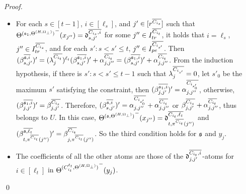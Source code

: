 \begin{appendix}
{\begin{proof}
\begin{itemize}
	\item For each $s \in [t-1]$, $i \in [\ell_s]$, and $j' \in [r^{\overline{C_{i_s}}}]$ such that ${\Theta^{({\mathfrak{s} }_1,\Theta^{(H,\Omega_\bot)})}}^-(x_{j''}) = \mathfrak{d}^{\overline{C_{i_s}, i}}_{s, j'}$ for some $j'' \in I^{\overline{C_{i_t}}}_{tr}$, it holds that $i = \ell_s$, $j'' \in I^{\overline{C_{i_s}}}_{tr}$, and for each $s': s < s' \le t$, $j'' \in I^{\overline{C_{i_{s'}}}}_{pe}$. Then $(\beta^{\overline{{\mathfrak{s} },i}}_{s,j'})' =(\lambda^{\overline{C_{i_t}}}_{j})^{\ell_t}  (\beta^{\overline{{\mathfrak{s} }_1, i}}_{s, j'})' + \alpha^{\overline{C_{i_t}}}_{j, j''}  =  (\beta^{\overline{{\mathfrak{s} }_1, i}}_{s, j'})' + \alpha^{\overline{C_{i_t}}}_{j, j''}$. From the induction hypothesis,  if there is $s': s < s' \le t-1$ such that $\lambda^{\overline{C_{i_{s'}}}}_j =0$, let $s'_0$ be the maximum $s'$ satisfying the constraint, then $(\beta^{\overline{{\mathfrak{s} }_1, i}}_{j,j'})'=\alpha^{\overline{C_{i_{s'_0}}}}_{j, j''}$, otherwise, $(\beta^{\overline{{\mathfrak{s} }_1, i}}_{j,j'})'= \beta^{\overline{C_{i_s}}}_{j,j'}$. Therefore, $(\beta^{\overline{{\mathfrak{s} },i}}_{s,j'})' = \alpha^{\overline{C_{i_{s'_0}}}}_{j, j''} + \alpha^{\overline{C_{i_t}}}_{j, j''}$ or $\beta^{\overline{C_{i_s}}}_{j,j'} + \alpha^{\overline{C_{i_t}}}_{j, j''}$, thus belongs to $U$. In this case, ${\Theta^{({\mathfrak{s} },\Theta^{(H,\Omega_\bot)})}}^-(x_{j''})=\mathfrak{d}^{\overline{C_{i_t},\ell_t}}_{t, \pi^{\overline{C_{i_t}}}(j'')}$ and $(\beta^{\overline{{\mathfrak{s} },\ell_t}}_{t, \pi^{\overline{C_{i_t}}}(j'')})' = \beta^{\overline{C_{i_t}}}_{j, \pi^{\overline{C_{i_t}}}(j'')}$. So the third condition holds for ${\mathfrak{s} }$ and $y_j$.
	\item The coefficients of all the other atoms are those of  the $\mathfrak{d}^{\overline{C_{i_t}, i}}_{j, j'}$-atoms for $i \in [\ell_t]$ in ${\Theta^{(C^{\ell_t}_{i_t},\Theta^{(H,\Omega_\bot)})}}^-(y_j)$.
\end{itemize} \qed

\end{proof}
}

\end{appendix}




